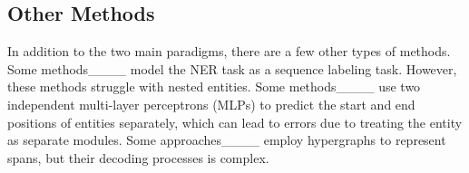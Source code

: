 \subsection{Other Methods}

In addition to the two main paradigms, there are a few other types of methods. 
Some methods____ model the NER task as a sequence labeling task. 
However, these methods struggle with nested entities. 
Some methods____ use two independent multi-layer perceptrons (MLPs) to predict the start and end positions of entities separately, which can lead to errors due to treating the entity as separate modules. 
Some approaches____ employ hypergraphs to represent spans, but their decoding processes is complex.